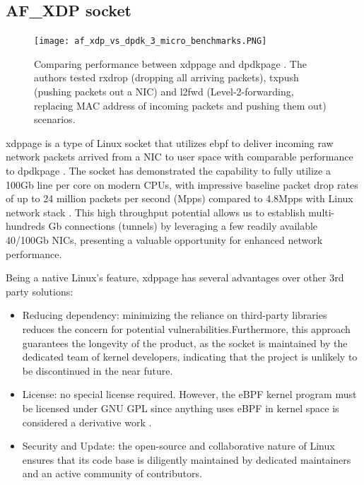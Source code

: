 \subsection{AF\_XDP socket}

\begin{figure}[H]
	\centering
	\texttt{[image: af\_xdp\_vs\_dpdk\_3\_micro\_benchmarks.PNG]}
	\caption{Comparing performance between \ac{xdppage} and \ac{dpdkpage} \cite{karlsson_path_to_dpdk_speednodate}. The authors tested  rxdrop (dropping all arriving packets), txpush (pushing packets out a NIC) and l2fwd (Level-2-forwarding, replacing MAC address of incoming packets and pushing them out) scenarios.}\label{fig:approach_design:af_xdp_vs_dpdk_3_micro_benchmarks}
\end{figure}

\ac{xdppage} is a type of Linux socket that utilizes \ac{ebpf} to deliver incoming raw network packets arrived from a \ac{NIC} to user space with comparable performance to \ac{dpdkpage} \cite{karlsson_path_to_dpdk_speednodate}. 
The socket has demonstrated the capability to fully utilize a 100Gb line per core on modern CPUs, with impressive baseline packet drop rates of up to 24 million packets per second (Mpps) compared to 4.8Mpps with Linux network stack \cite{hoiland_jorgensen_express_2018} \cite{intel_dpdk_perf}.
This high throughput potential allows us to establish multi-hundreds Gb connections (tunnels) by leveraging a few readily available 40/100Gb NICs, presenting a valuable opportunity for enhanced network performance.

Being a native Linux's feature, \ac{xdppage} has several advantages over other 3rd party solutions:
\begin{itemize}
	\item Reducing dependency: minimizing the reliance on third-party libraries reduces the concern for potential vulnerabilities.Furthermore, this approach guarantees the longevity of the product, as the socket is maintained by the dedicated team of kernel developers, indicating that the project is unlikely to be discontinued in the near future. 
	\item License: no special license required. However, the eBPF kernel program must be licensed under GNU \ac{GPL} since anything uses eBPF in kernel space is considered a derivative work \cite{gpl_email_discussion} \cite{linux_license_rule} \cite{lwn_clarify_bpf_license}.
	\item Security and Update: the open-source and collaborative nature of Linux ensures that its code base is diligently maintained by dedicated maintainers and an active community of contributors.
\end{itemize}

